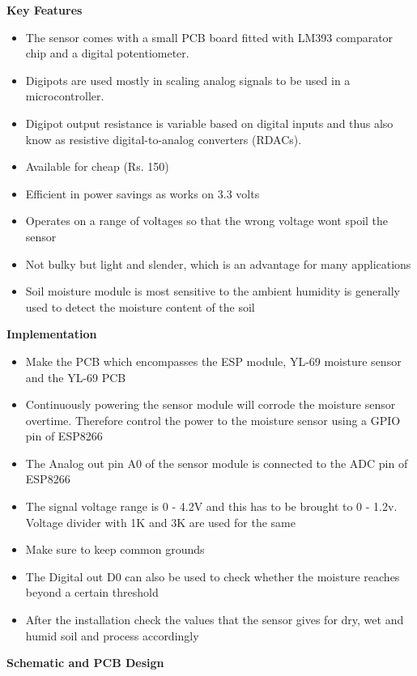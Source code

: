 \documentclass[16pt]{article}
\begin{document}
\begin{itemize}
\vspace{0.5cm}
{\Large{\textbf{Key Features}}}

\begin{itemize}

\item
  The sensor comes with a small PCB board fitted with LM393 comparator
  chip and a digital potentiometer.
\item
  Digipots are used mostly in scaling analog signals to be used in a
  microcontroller.
\item
  Digipot output resistance is variable based on digital inputs and thus
  also know as resistive digital-to-analog converters (RDACs).
\item
  Available for cheap (Rs. 150)
\item
  Efficient in power savings as works on 3.3 volts
\item
  Operates on a range of voltages so that the wrong voltage wont spoil
  the sensor
\item
  Not bulky but light and slender, which is an advantage for many
  applications
\item
  Soil moisture module is most sensitive to the ambient humidity is
  generally used to detect the \vspace{0.5cm}moisture content of the soil
\end{itemize}

{\Large{\textbf{Implementation}}}

\begin{itemize}

\item
  Make the PCB which encompasses the ESP module, YL-69 moisture sensor
  and the YL-69 PCB
\item
  Continuously powering the sensor module will corrode the moisture
  sensor overtime. Therefore control the power to the moisture sensor
  using a GPIO pin of ESP8266
\item
  The Analog out pin A0 of the sensor module is connected to the ADC pin
  of ESP8266
\item
  The signal voltage range is 0 - 4.2V and this has to be brought to 0 -
  1.2v. Voltage divider with 1K and 3K are used for the same
\item
  Make sure to keep common grounds
\item
  The Digital out D0 can also be used to check whether the moisture
  reaches beyond a certain threshold
\item
  After the installation check the values that the sensor gives for dry,
  wet and humid soil and process accordingly
\end{itemize}

\vspace{0.5cm}

{\Large{\item{\textbf{Schematic and PCB
Design}}}}

\end{itemize}
\end{document}
